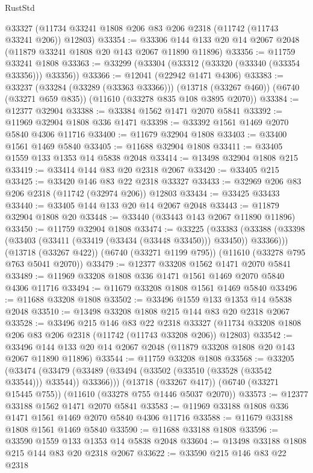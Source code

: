 \begin{lexlean}{RustStd}
\begin{coremodule}
    @33327
    (@11734 @33241 @1808 @206 @83 @206 @2318 (@11742 (@11743 @33241 @206)) @12803)
@33354 := @33306 @144 @133 @20 @14 @2067 @2048 (@11879 @33241 @1808 @20 @143 @2067 @11890 @11896)
@33356 := @11759 @33241 @1808
@33363 := @33299 (@33304 (@33312 (@33320 (@33340 (@33354 @33356))) @33356))
@33366 := @12041 (@22942 @1471 @4306)
@33383 := @33237
    (@33284 (@33289 (@33363 @33366)))
    (@13718 (@33267 @460))
    (@6740 (@33271 @659 @835))
    (@11610 (@33278 @835 @108 @3895 @2070))
@33384 := @12377 @32904
@33388 := @33384 @1562 @1471 @2070 @5841
@33392 := @11969 @32904 @1808 @336 @1471
@33398 := @33392 @1561 @1469 @2070 @5840 @4306 @11716
@33400 := @11679 @32904 @1808
@33403 := @33400 @1561 @1469 @5840
@33405 := @11688 @32904 @1808
@33411 := @33405 @1559 @133 @1353 @14 @5838 @2048
@33414 := @13498 @32904 @1808 @215
@33419 := @33414 @144 @83 @20 @2318 @2067
@33420 := @33405 @215
@33425 := @33420 @146 @83 @22 @2318 @33327
@33433 := @32969 @206 @83 @206 @2318 (@11742 (@32974 @206)) @12803
@33434 := @33425 @33433
@33440 := @33405 @144 @133 @20 @14 @2067 @2048
@33443 := @11879 @32904 @1808 @20
@33448 := @33440 (@33443 @143 @2067 @11890 @11896)
@33450 := @11759 @32904 @1808
@33474 := @33225
    (@33383 (@33388 (@33398 (@33403 (@33411 (@33419 (@33434 (@33448 @33450))) @33450)) @33366)))
    (@13718 (@33267 @422))
    (@6740 (@33271 @1199 @795))
    (@11610 (@33278 @795 @763 @5041 @2070))
@33479 := @12377 @33208 @1562 @1471 @2070 @5841
@33489 := @11969 @33208 @1808 @336 @1471 @1561 @1469 @2070 @5840 @4306 @11716
@33494 := @11679 @33208 @1808 @1561 @1469 @5840
@33496 := @11688 @33208 @1808
@33502 := @33496 @1559 @133 @1353 @14 @5838 @2048
@33510 := @13498 @33208 @1808 @215 @144 @83 @20 @2318 @2067
@33528 := @33496
    @215
    @146
    @83
    @22
    @2318
    @33327
    (@11734 @33208 @1808 @206 @83 @206 @2318 (@11742 (@11743 @33208 @206)) @12803)
@33542 := @33496 @144 @133 @20 @14 @2067 @2048 (@11879 @33208 @1808 @20 @143 @2067 @11890 @11896)
@33544 := @11759 @33208 @1808
@33568 := @33205
    (@33474 (@33479 (@33489 (@33494 (@33502 (@33510 (@33528 (@33542 @33544))) @33544)) @33366)))
    (@13718 (@33267 @417))
    (@6740 (@33271 @15445 @755))
    (@11610 (@33278 @755 @1446 @5037 @2070))
@33573 := @12377 @33188 @1562 @1471 @2070 @5841
@33583 := @11969 @33188 @1808 @336 @1471 @1561 @1469 @2070 @5840 @4306 @11716
@33588 := @11679 @33188 @1808 @1561 @1469 @5840
@33590 := @11688 @33188 @1808
@33596 := @33590 @1559 @133 @1353 @14 @5838 @2048
@33604 := @13498 @33188 @1808 @215 @144 @83 @20 @2318 @2067
@33622 := @33590
    @215
    @146
    @83
    @22
    @2318

\end{coremodule}
\end{lexlean}
